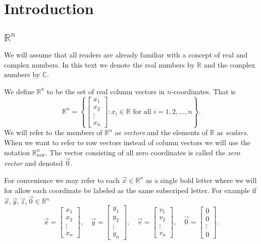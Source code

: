 \section{Introduction}
\subsection{$\mathbb{R}^n$}
We will assume that all readers are already familiar with a concept of real and complex numbers. 
In this text we denote the real numbers by $\mathbb{R}$ and the complex numbers by $\mathbb{C}$. 

\begin{definition}
We define $\mathbb{R}^n$ to be the set of real column vectors in $n$-coordinates. That is 
\[
\mathbb{R}^n=\left\{ 
\begin{bmatrix}
x_1\\ x_2 \\ \vdots \\ x_n
\end{bmatrix} 
: x_i \in \mathbb{R}\text{ for all }i=1,2, \ldots, n \right\}.
\]
We will refer to the members of $\mathbb{R}^n$ as \emph{vectors} and the 
elements of $\mathbb{R}$ as \emph{scalars}. When we want to refer to row 
vectors instead of column vectors we will use the notation 
$\mathbb{R}^n_\text{row}$. The vector consisting of all zero coordinates is 
called the \emph{zero vector} and denoted $\vec{0}$.
\end{definition}

For convenience we may refer to each $\vec{x} \in \mathbb{R}^n$ as a single 
bold letter where we will for allow each coordinate be labeled as the same 
subscriped letter. For example if $\vec{x}, \vec{y}, \vec{z}, \vec{0} \in \mathbb{R}^n$
\[
\vec{x}=\begin{bmatrix}x_1\\ x_2 \\ \vdots \\ x_n\end{bmatrix}, \quad 
\vec{y}=\begin{bmatrix}y_1\\ y_2 \\ \vdots \\ y_n\end{bmatrix}, \quad 
\vec{v}=\begin{bmatrix}v_1\\ v_2 \\ \vdots \\ v_n\end{bmatrix}, \quad 
\vec{0}=\begin{bmatrix}0\\ 0 \\ \vdots \\ 0\end{bmatrix}.
\]

